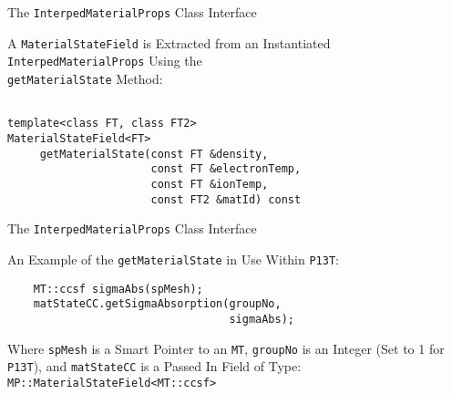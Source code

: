 \documentclass{myslidehead}
\begin{document}
\begin{slide}
  
  \begin{center}
    \large The \verb#InterpedMaterialProps# Class Interface
  \end{center}

  A \verb#MaterialStateField# is Extracted from an
  Instantiated \verb#InterpedMaterialProps# Using the \\
  \verb#getMaterialState# Method:

  \begin{verbatim}

template<class FT, class FT2>
MaterialStateField<FT>
     getMaterialState(const FT &density,
                      const FT &electronTemp,
                      const FT &ionTemp,
                      const FT2 &matId) const
  \end{verbatim}

\end{slide}


\begin{slide}
  
  \begin{center}
    \large The \verb#InterpedMaterialProps# Class Interface
  \end{center}

  An Example of the \verb#getMaterialState# in Use Within \verb#P13T#:

  \begin{verbatim}
    MT::ccsf sigmaAbs(spMesh);
    matStateCC.getSigmaAbsorption(groupNo,
                                  sigmaAbs);
  \end{verbatim}

  Where \verb#spMesh# is a Smart Pointer to an \verb#MT#,
  \verb#groupNo# is an Integer (Set to 1 for \verb#P13T#),
  and \verb#matStateCC# is a Passed In Field of Type: \\
  \verb#MP::MaterialStateField<MT::ccsf>#

\end{slide}

\end{document}
